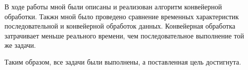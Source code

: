 
В ходе работы мной были описаны и реализован алгоритм конвейерной обработки. Такжн мной было проведено сравнение временных характеристик последовательной и конвейерной обработок данных. Конвейерная обработка затрачивает меньше реального времени, чем последовательное выполнение той же задачи. 

Таким образом, все задачи были выполнены, а поставленная цель достигнута.